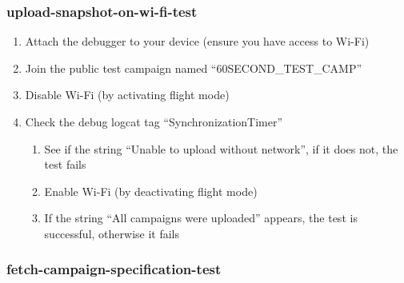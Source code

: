 \subsubsection{upload-snapshot-on-wi-fi-test}

\begin{enumerate}
    \item Attach the debugger to your device (ensure you have access to Wi-Fi)
    \item Join the public test campaign named ``60SECOND\_TEST\_CAMP''
    \item Disable Wi-Fi (by activating flight mode)
    \item Check the debug logcat tag ``SynchronizationTimer''
        \begin{enumerate}
            \item See if the string ``Unable to upload without network'', if it does not, the test fails
            \item Enable Wi-Fi (by deactivating flight mode)
            \item If the string ``All campaigns were uploaded'' appears, the test is successful, otherwise it fails
        \end{enumerate}
\end{enumerate}

\newpage
\subsubsection{fetch-campaign-specification-test}

